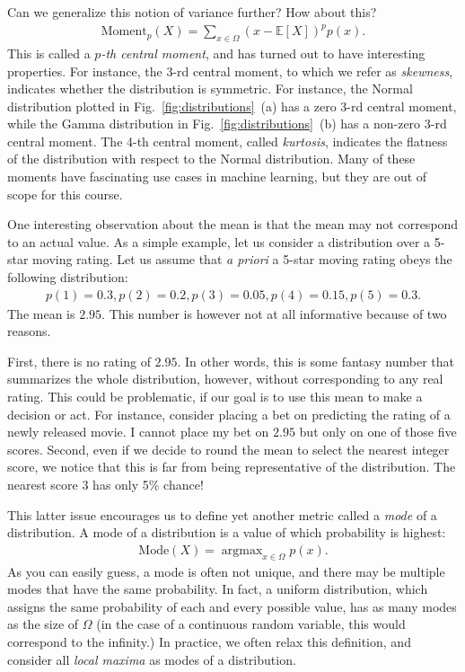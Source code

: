 \documentclass{report}
\newcommand{\E}[0]{\mathbb{E}}
\DeclareMathOperator*{\argmax}{\arg \max}
\begin{document}
Can we generalize this notion of variance further? How about this?
\begin{align}
    \label{eq:central_moment}
    \text{Moment}_p(X) = \sum_{x \in \Omega} (x - \E\left[ X \right])^p p(x).
\end{align}
This is called a {\it $p$-th central moment}, and has turned out to have
interesting properties. For instance, the 3-rd central moment, to which we refer
as {\it skewness}, indicates whether the distribution is symmetric. For
instance, the Normal distribution plotted in Fig.~\ref{fig:distributions}~(a)
has a zero 3-rd central moment, while the Gamma distribution in
Fig.~\ref{fig:distributions}~(b) has a non-zero 3-rd central moment. The 4-th
central moment, called {\it kurtosis}, indicates the flatness of the
distribution with respect to the Normal distribution. Many of these moments have
fascinating use cases in machine learning, but they are out of scope for this
course. 

One interesting observation about the mean is that the mean may not correspond
to an actual value. As a simple example, let us consider a distribution over a
5-star moving rating. Let us assume that {\it a priori} a 5-star moving rating
obeys the following distribution:
\begin{align*}
    p(1) = 0.3, p(2) = 0.2, p(3) = 0.05, p(4) = 0.15, p(5) = 0.3.
\end{align*}
The mean is $2.95$. This number is however not at all informative because of
two reasons.

First, there is no rating of $2.95$. In other words, this is some fantasy number
that summarizes the whole distribution, however, without corresponding to any
real rating. This could be problematic, if our goal is to use this mean to make
a decision or act. For instance, consider placing a bet on predicting the rating
of a newly released movie. I cannot place my bet on $2.95$ but only on one of
those five scores.  Second, even if we decide to round the mean to select the
nearest integer score, we notice that this is far from being representative of
the distribution. The nearest score $3$ has only 5\% chance! 

This latter issue encourages us to define yet another metric called a {\it mode}
of a distribution. A mode of a distribution is a value of which probability is
highest:
\begin{align*}
    \text{Mode}(X) = \argmax_{x \in \Omega} p(x).
\end{align*}
As you can easily guess, a mode is often not unique, and there may be multiple
modes that have the same probability. In fact, a uniform distribution, which
assigns the same probability of each and every possible value, has as many modes
as the size of $\Omega$ (in the case of a continuous random variable, this would
correspond to the infinity.) In practice, we often relax this definition, and
consider all {\it local maxima} as modes of a distribution.
\end{document}

